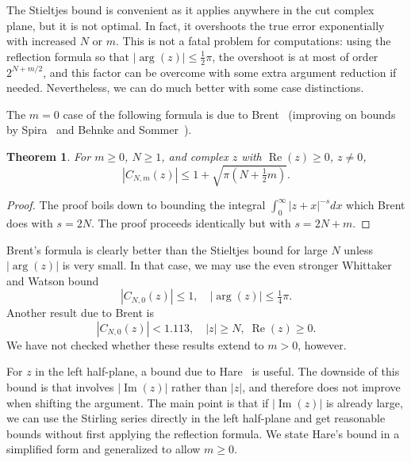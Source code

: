 \documentclass[reqno]{amsart}
\newtheorem{theorem}{Theorem}[section]
\theoremstyle{definition}
\begin{document}
The Stieltjes bound is convenient as it applies anywhere in the
cut complex plane, but it is not optimal. In fact, it overshoots the true
error exponentially with increased $N$ or $m$.
This is not a fatal problem for computations: using the reflection formula
so that $|\operatorname{arg}(z)| \le \tfrac{1}{2} \pi$,
the overshoot is at most of order $2^{N+m/2}$,
and this factor can be overcome with some extra argument reduction if needed.
Nevertheless, we can do much better with some case distinctions.

The $m = 0$ case of the following formula
is due to Brent~\cite[Theorem 1 and Corollary 1]{Brent2018} (improving on bounds by Spira~\cite{Spira1971} and Behnke and Sommer~\cite{behnke1962theorie}).

\begin{theorem}
For $m \ge 0$, $N \ge 1$, and complex $z$ with $\operatorname{Re}(z) \ge 0$, $z \ne 0$,
\begin{equation}
|C_{N,m}(z)| \le 1 + \sqrt{\pi (N + \tfrac{1}{2} m)}.
\label{eq:stirbound2}
\end{equation}
\end{theorem}

\begin{proof}
The proof boils down to bounding the integral $\int_0^{\infty} |z + x|^{-s} dx$ which
Brent does with $s = 2N$. The proof proceeds identically but with $s = 2N + m$.
\end{proof}

Brent's formula is clearly better than the Stieltjes bound for large $N$ unless $|\operatorname{arg}(z)|$ is very small.
In that case, we may use the even stronger Whittaker and Watson bound~\cite[Section 12.33]{WhittakerWatson1920}
\begin{equation}
|C_{N,0}(z)| \le 1, \quad |\operatorname{arg}(z)| \le \tfrac{1}{4} \pi.
\end{equation}
Another result due to Brent is \cite[Theorem 2]{Brent2018}
\begin{equation}
|C_{N,0}(z)| < 1.113, \quad |z| \ge N, \; \operatorname{Re}(z) \ge 0.
\end{equation}
We have not checked whether these results extend to $m > 0$, however.

For $z$ in the left half-plane, a bound due to Hare~\cite{Hare1997} is useful.
The downside of this bound is that involves $|\operatorname{Im}(z)|$ rather than $|z|$,
and therefore does not improve when shifting the argument.
The main point is that if $|\operatorname{Im}(z)|$ is already large,
we can use the Stirling series directly in the left half-plane
and get reasonable bounds without first applying the reflection formula.
We state Hare's bound in a simplified form and generalized to
allow $m \ge 0$.
\end{document}
